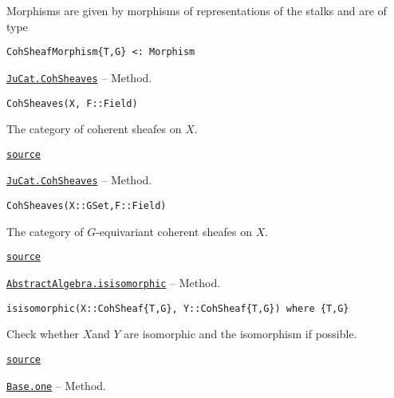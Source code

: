 \documentclass{memoir}
\begin{document}
Morphisms are given by morphisms of representations of the stalks and are of type




\begin{lstlisting}
CohSheafMorphism{T,G} <: Morphism
\end{lstlisting}


\hypertarget{5299226145830094980}{} 
\hyperlink{5299226145830094980}{\texttt{JuCat.CohSheaves}}  -- {Method.}

\begin{adjustwidth}{2em}{0pt}


\begin{verbatim}
CohSheaves(X, F::Field)
\end{verbatim}

The category of coherent sheafes on \(X\).



\href{https://github.com/FabianMaeurer/JuCat.jl/blob/367390e2d003deec2ababa73caeab405e934bb35/src/structures/ConvolutionCategory/CoherentSheaves.jl#L35-L39}{\texttt{source}}


\end{adjustwidth}
\hypertarget{12460639737943450204}{} 
\hyperlink{12460639737943450204}{\texttt{JuCat.CohSheaves}}  -- {Method.}

\begin{adjustwidth}{2em}{0pt}


\begin{verbatim}
CohSheaves(X::GSet,F::Field)
\end{verbatim}

The category of \(G\)-equivariant coherent sheafes on \(X\).



\href{https://github.com/FabianMaeurer/JuCat.jl/blob/367390e2d003deec2ababa73caeab405e934bb35/src/structures/ConvolutionCategory/CoherentSheaves.jl#L23-L27}{\texttt{source}}


\end{adjustwidth}
\hypertarget{8327360857040738072}{} 
\hyperlink{8327360857040738072}{\texttt{AbstractAlgebra.isisomorphic}}  -- {Method.}

\begin{adjustwidth}{2em}{0pt}


\begin{verbatim}
isisomorphic(X::CohSheaf{T,G}, Y::CohSheaf{T,G}) where {T,G}
\end{verbatim}

Check whether \(X\)and \(Y\) are isomorphic and the isomorphism if possible.



\href{https://github.com/FabianMaeurer/JuCat.jl/blob/367390e2d003deec2ababa73caeab405e934bb35/src/structures/ConvolutionCategory/CoherentSheaves.jl#L94-L98}{\texttt{source}}


\end{adjustwidth}
\hypertarget{10859713285095806556}{} 
\hyperlink{10859713285095806556}{\texttt{Base.one}}  -- {Method.}
\end{document}
